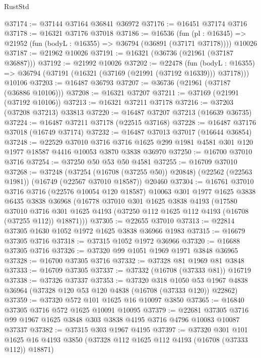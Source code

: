 \begin{lexlean}{RustStd}
\begin{coremodule}
@37174 := @37144 @37164 @36841 @36972
@37176 := @16451 @37174 @3716
@37178 := @16321 @37176 @37018
@37186 := @16536
    (fun (pl : @16345) => @21952 (fun (bodyL : @16355) => @36794 (@36891 (@37171 @37178))))
    @10026
@37187 := @21962 @10026
@37191 := @16321 (@36736 (@21961 (@37187 @36887)))
@37192 := @21992 @10026
@37202 := @22478
    (fun (bodyL : @16355) => @36794 (@37191 (@16321 (@37169 (@21991 (@37192 @16339))) @37178)))
    @10106
@37203 := @16487 @36793
@37207 := @36736 (@21961 (@37187 (@36886 @10106)))
@37208 := @16321 @37207
@37211 := @37169 (@21991 (@37192 @10106))
@37213 := @16321 @37211 @37178
@37216 := @37203 (@37208 @37213) @33813
@37220 := @16487 @37207 @37213 (@16639 @36735)
@37224 := @16487 @37211 @37178 (@22515 @37168)
@37228 := @16487 @37176 @37018 (@16749 @37174)
@37232 := @16487 @37013 @37017 (@16644 @36854)
@37248 := @22529
    @37010
    @3716
    @3716
    @1625
    @299
    @1981
    @4581
    @301
    @120
    @1977
    @18587
    @4416
    @10053
    @3870
    @3838
    @36970
@37250 := @16700 @37010 @3716
@37254 := @37250 @50 @53 @50 @4581
@37255 := @16709 @37010
@37268 := @37248
    (@37254 (@16708 (@37255 @50)) @20848)
    (@22562 (@22563 @1981))
    (@16749 (@22567 @37010 @18587))
    @20460
@37304 := @16761
    @37010
    @3716
    @3716
    (@22576 @10054 @120 @18587)
    @10063
    @301
    @1977
    @1625
    @3838
    @6435
    @3838
    @36968
    (@16778
      @37010
      @301
      @1625
      @3838
      @4193
      (@17580
        @37010
        @3716
        @301
        @1625
        @4193
        (@37250 @112 @1625 @112 @4193 (@16708 (@37255 @112)) @18871)))
@37305 := @22655 @37010
@37313 := @22814 @37305 @1630 @1052 @1972 @1625 @3838 @36966 @1983
@37315 := @16679 @37305 @3716
@37318 := @37315 @1052 @1972 @36966
@37320 := @16688 @37305 @3716
@37326 := @37320 @99 @1051 @1969 @1971 @3848 @36965
@37328 := @16700 @37305 @3716
@37332 := @37328 @81 @1969 @81 @3848
@37333 := @16709 @37305
@37337 := @37332 (@16708 (@37333 @81)) @16719
@37338 := @37326 @37337
@37353 := @37320
    @318
    @1050
    @53
    @1967
    @4838
    @36964
    (@37328 @120 @53 @120 @4838 (@16708 (@37333 @120)) @22862)
@37359 := @37320 @572 @101 @1625 @16 @10097 @3850
@37365 := @16840 @37305 @3716 @572 @1625 @10091 @10095
@37379 := @22681
    @37305
    @3716
    @99
    @1967
    @1625
    @3848
    @303
    @3838
    @4195
    @3716
    @4796
    @10083
    @10087
    @37337
@37382 := @37315 @303 @1967 @4195
@37397 := @37320
    @301
    @101
    @1625
    @16
    @4193
    @3850
    (@37328 @112 @1625 @112 @4193 (@16708 (@37333 @112)) @18871)

\end{coremodule}
\end{lexlean}
